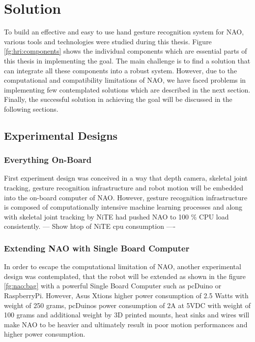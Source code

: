 \chapter{Solution} To build an effective and easy to use hand gesture recognition system for NAO, various tools and technologies were studied during this thesis. Figure \ref{fg:hri:components} shows the individual components which are essential parts of this thesis in implementing the goal. The main challenge is to find a solution that can integrate all these components into a robust system. However, due to the computational and compatibility limitations of NAO, we have faced problems in implementing few contemplated solutions which are described in the next section. Finally, the successful solution in achieving the goal will be discussed in the following sections.



\section{Experimental Designs} 
\subsection{Everything On-Board} First experiment design was conceived in a way that depth camera, skeletal joint tracking, gesture recognition infrastructure and robot motion will be embedded into the on-board computer of NAO. However, gesture recognition infrastructure is composed of computationally intensive machine learning processes and along with skeletal joint tracking by NiTE had pushed NAO to 100 $ \% $ CPU load consistently. --- Show htop of NiTE cpu consumption ----

\subsection{Extending NAO with Single Board Computer} In order to escape the computational limitation of NAO, another experimental design was contemplated, that the robot will be extended as shown in the figure \ref{fg:nao:bag} with a powerful Single Board Computer such as pcDuino or RaspberryPi. However, Asus Xtions higher power consumption of 2.5 Watts with weight of 250 grams, pcDuinos power consumption of 2A at 5VDC with weight of 100 grams and additional weight by 3D printed mounts, heat sinks and wires will make NAO to be heavier and ultimately result in poor motion performances and higher power consumption. 

